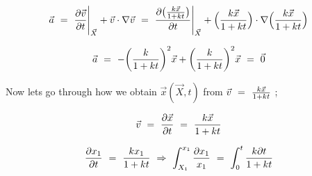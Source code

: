 \documentclass{article}
\begin{document}
\begin{equation} \label{eq:1}
\vec{a} \hspace{0.125cm} = \hspace{0.125cm} \frac{\partial{\vec{v}}}{\partial{t}}\Bigg|_{\vec{X}} +  \vec{v}\cdot\nabla{\vec{v}} \hspace{0.125cm} = \hspace{0.125cm} \frac{\partial{\big( \frac{k \vec{x}}{1 +kt}}\big)}{\partial{t}}\Bigg|_{\vec{X}} + \Big( \frac{k \vec{x}}{1 +kt}\Big) \cdot \nabla{\Big( \frac{k \vec{x}}{1 +kt}\Big)}\hspace{0.125cm}
\end{equation} 

\begin{equation} \label{eq:1}
\vec{a} \hspace{0.125cm} = \hspace{0.125cm} - \bigg( \frac{k}{1 +kt}\bigg)^2 \vec{x} + \bigg( \frac{k}{1 +kt}\bigg)^2 \vec{x} \hspace{0.125cm} = \hspace{0.125cm} \vec{0} \hspace{0.125cm}
\end{equation} 

Now lets go through how we obtain \begin{math} \vec{x}( \vec{X} , t ) \end{math} from \begin{math} \vec{v} \hspace{0.125cm} = \hspace{0.125cm} \frac{k \vec{x}}{1 + kt} \end{math} ; 

\begin{equation} \label{eq:1}
\vec{v} \hspace{0.125cm} = \hspace{0.125cm} \frac{\partial{\vec{x}}}{\partial{t}} \hspace{0.125cm} = \hspace{0.125cm} \frac{k \vec{x}}{1 + kt} \hspace{0.125cm}
\end{equation}

\begin{equation} \label{eq:1}
\frac{\partial{x_1}}{\partial{t}} \hspace{0.125cm} = \hspace{0.125cm} \frac{k x_1}{1 + kt} \hspace{0.125cm} \Rightarrow \hspace{0.125cm} \int_{X_1}^{x_1} \frac{\partial{x_1}}{x_1} \hspace{0.125cm} = \hspace{0.125cm} \int_{0}^{t} \frac{k \partial{t}}{1 + kt} \hspace{0.125cm}
\end{equation}
\end{document}
